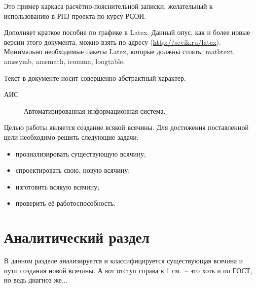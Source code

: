 \documentclass[utf8]{G7-32} %
\begin{document}

\frontmatter %

\Referat
Это пример каркаса расчётно-пояснительной записки, желательный к использованию в РПЗ проекта по курсу РСОИ.

Дополняет краткое пособие по графике в Latex.  Данный опус, как и более новые версии этого документа, можно взять по адресу (\url{http://sevik.ru/latex}). Минимально необходимые пакеты Latex, которые должны стоять: mathtext, amssymb, amsmath, icomma, longtable.

Текст в документе носит совершенно абстрактный характер.

\tableofcontents


\Abbreviations %
\begin{description}
\item[АИС] Автоматизированная информационная система.
\end{description}

\Introduction

Целью работы является создание всякой всячины. Для достижения поставленной цели необходимо решить следующие задачи:
%
\begin{itemize}
\item проанализировать существующую всячину;
\item спроектировать свою, новую всячину;
\item изготовить всякую всячину;
\item проверить её работоспособность.
\end{itemize}

\mainmatter %

\chapter{Аналитический раздел}
%
%
В данном разделе анализируется и классифицируется существующая всячина и пути создания новой всячины. А вот отступ справа в 1 см.~-- это хоть и по ГОСТ, но ведь диагноз же...
%
\end{document}
